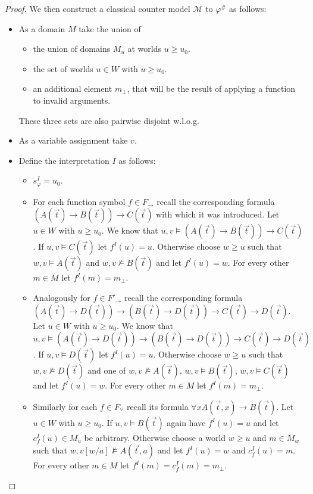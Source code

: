 \documentclass[a4paper,12pt]{report}
\theoremstyle{definition}
\theoremstyle{definition}
\theoremstyle{definition}
\theoremstyle{definition}
\theoremstyle{definition}
\theoremstyle{definition}
\theoremstyle{definition}
\begin{document}
\begin{proof}
		We then construct a classical counter model $\mathcal M$ to $\varphi^\#$ as follows:
		\begin{itemize}
			\item As a domain $M$ take the union of
			\begin{itemize}
				\item the union of domains $M_u$ at worlds $u\geq u_0$.
				\item the set of worlds $u\in W$ with $u\geq u_0$.
				\item an additional element $m_\bot$, that will be the result of applying a function to invalid arguments.
			\end{itemize}
			These three sets are also pairwise disjoint w.l.o.g.
			\item As a variable assignment take $v$.
			\item Define the interpretation $I$ as follows:
			\begin{itemize}
				\item $s_\varphi^I = u_0$.
				\item For each function symbol $f\in F_\to$ recall the corresponding formula $(A(\vec t)\to B(\vec t))\to C(\vec t)$ with which it was introduced. Let $u\in W$ with $u\geq u_0$. We know that $u, v\models (A(\vec t)\to B(\vec t))\to C(\vec t)$. If $u, v\models C(\vec t)$ let $f^I(u) = u$. Otherwise choose $w\geq u$ such that $w, v\models A(\vec t)$ and $w, v\not\models B(\vec t)$ and let $f^I(u) = w$. For every other $m\in M$ let $f^I(m) = m_\bot$.
				\item Analogously for $f\in F'_\to$ recall the corresponding formula $(A(\vec t)\to D(\vec t))\to (B(\vec t)\to D(\vec t))\to C(\vec t)\to D(\vec t)$. Let $u\in W$ with $u\geq u_0$. We know that $u, v\models (A(\vec t)\to D(\vec t))\to (B(\vec t)\to D(\vec t))\to C(\vec t)\to D(\vec t)$. If $u, v\models D(\vec t)$ let $f^I(u) = u$. Otherwise choose $w\geq u$ such that $w, v\not\models D(\vec t)$ and one of $w, v\not\models A(\vec t)$, $w, v\models B(\vec t)$, $w, v\models C(\vec t)$
				and let $f^I(u) = w$. For every other $m\in M$ let $f^I(m) = m_\bot$.
				\item Similarly for each $f\in F_\forall$ recall its formula $\forall xA(\vec t, x)\to B(\vec t)$. Let $u\in W$ with $u\geq u_0$. If $u, v\models B(\vec t)$ again have $f^I(u) = u$ and let $c_f^I(u)\in M_u$ be arbitrary. Otherwise choose a world $w\geq u$ and $m\in M_w$ such that $w, v[w/a]\not\models A(\vec t, a)$ and let $f^I(u) = w$ and $c_f^I(u) = m$. For every other $m\in M$ let $f^I(m) = c_f^I(m) = m_\bot$.

\end{itemize}
\end{itemize}
\end{proof}
\end{document}
